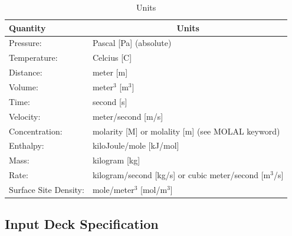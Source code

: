 \begin{table}[h]\centering
\caption{Units}\label{tunits}

\vspace{3mm}

\begin{tabular}{ll}
\toprule[2pt]
Quantity & \multicolumn{1}{c}{Units}\\
\midrule[1pt]
Pressure: & Pascal [Pa] (absolute)\\
Temperature: & Celcius [C]\\
Distance: & meter [m]\\
Volume: & meter$^3$ [m$^3$]\\
Time: & second [s]\\
Velocity: & meter/second [m/s]\\
Concentration: & molarity [M] or molality [m] (see MOLAL keyword)\\
Enthalpy: & kiloJoule/mole [kJ/mol]\\
Mass: & kilogram [kg]\\
Rate: & kilogram/second [kg/s] or cubic meter/second [m$^3$/s]\\
Surface Site Density: & mole/meter$^{3}$ [mol/m$^{3}$]\\
\bottomrule[1.5pt]
\end{tabular}
\end{table}

\subsection{Input Deck Specification}

\protect\hypertarget{target_simulation}{}

